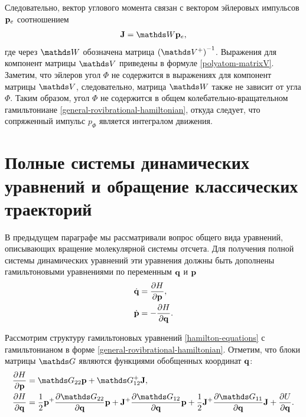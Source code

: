 Следовательно, вектор углового момента связан с вектором эйлеровых импульсов $\mathbf{p}_e$ соотношением
\begin{gather}
    \mf{J} = \bbW \pe, \label{polyatom-angular-momentum-euler-momenta}
\end{gather}
%
где через $\bbW$ обозначена матрица $\lb \bbV^{+} \rb^{-1}$. Выражения для компонент матрицы $\bbV$ приведены в формуле \eqref{polyatom-matrixV}. Заметим, что эйлеров угол $\Phi$ не содержится в выражениях для компонент матрицы $\bbV$, следовательно, матрица $\bbW$ также не зависит от угла $\Phi$. Таким образом, угол $\Phi$ не содержится в общем колебательно-вращательном гамильтониане \eqref{general-rovibrational-hamiltonian}, откуда следует, что сопряженный импульс $p_\Phi$ является интегралом движения. \par

\section{Полные системы динамических уравнений и обращение классических траекторий} \label{section:dynamic-equations}

В предыдущем параграфе мы рассматривали вопрос общего вида уравнений, описывающих вращение молекулярной системы отсчета. Для получения полной системы динамических уравнений эти уравнения должны быть дополнены гамильтоновыми уравнениями по переменным $\mathbf{q}$ и $\mathbf{p}$
\begin{gather}
    \begin{aligned}
        \dot{\mathbf{q}} &= \frac{\partial H}{\partial \mathbf{p}}, \\
        \dot{\mathbf{p}} &= -\frac{\partial H}{\partial \mathbf{q}}.
    \end{aligned} \label{hamilton-equations}
\end{gather}

Рассмотрим структуру гамильтоновых уравнений \eqref{hamilton-equations} с гамильтонианом в форме \eqref{general-rovibrational-hamiltonian}. Отметим, что блоки матрицы $\bbG$ являются функциями обобщенных координат $\mathbf{q}$:
\begin{gather}
    \begin{aligned}
        \frac{\partial H}{\partial \mf{p}} &= \bbG_{22} \mf{p} + \bbG_{12}^{+} \mf{J}, \\
        \frac{\partial H}{\partial \mf{q}} &= \frac{1}{2} \mf{p}^+ \frac{\partial \bbG_{22}}{\partial \mf{q}} \mf{p} + \mf{J}^+ \frac{\partial \bbG_{12}}{\partial \mf{q}} \mf{p} + \frac{1}{2} \mf{J}^+ \frac{\partial \bbG_{11}}{\partial \mf{q}} \mf{J} + \frac{\partial U}{\partial \mf{q}}.
    \end{aligned} \label{hamilton-equations1}
\end{gather}

